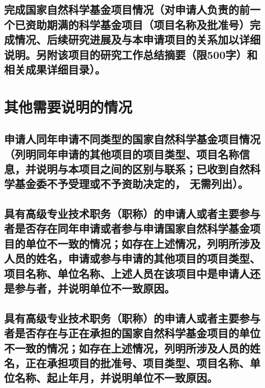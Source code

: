 \documentclass[UTF8, punct, oneside, fontset=none]{ctexbook}
\begin{document}
\begin{MS}
	
\end{MS}


\section{\textbf{完成国家自然科学基金项目情况}（对申请人负责的前一个已资助期满的科学基金项目\kg{0.15em}（项目名称及批准号）\kg{0.15em}完成情况、\kg{0.15em}后续研究进展及与本申请项目的关系加以详细说明。\kg{0.3em}另附该项目的研究工作总结摘要（限500字）和相关成果详细目录）。}

\begin{MS}
	
\end{MS}

\chapter{\textbf{其他需要说明的情况}}
\section{申请人同年申请不同类型的国家自然科学基金项目情况（列明同年申请的其他项目的项目类型、\kg{0.2em}项目名称信息，\kg{0.2em}并说明与本项目之间的区别与联系；已收到自然科学基金委不予受理或不予资助决定的， 无需列出）。}

\begin{MS}
	
\end{MS}

\section{具有高级专业技术职务\kg{0.2em}（职称）\kg{0.2em}的申请人或者主要参与者是否存在同年申请或者参与申请国家自然科学基金项目的单位不一致的情况；\kg{0.1em}如存在上述情况，\kg{0.1em}列明所涉及人员的姓名，\kg{0.1em}申请或参与申请的其他项目的项目类型、\kg{0.2em}项目名称、\kg{0.2em}单位名称、\kg{0.2em}上述人员在该项目中是申请人还是参与者，并说明单位不一致原因。}

\begin{MS}
	
\end{MS}

\section{具有高级专业技术职务\kg{0.2em}（职称）\kg{0.2em}的申请人或者主要参与者是否存在与正在承担的国家自然科学基金项目的单位不一致的情况；\kg{0.2em}如存在上述情况，列明所涉及人员的姓名，\kg{0.2em}正在承担项目的批准号、\kg{0.2em}项目类型、\kg{0.2em}项目名称、单位名称、起止年月，并说明单位不一致原因。}
\end{document}
